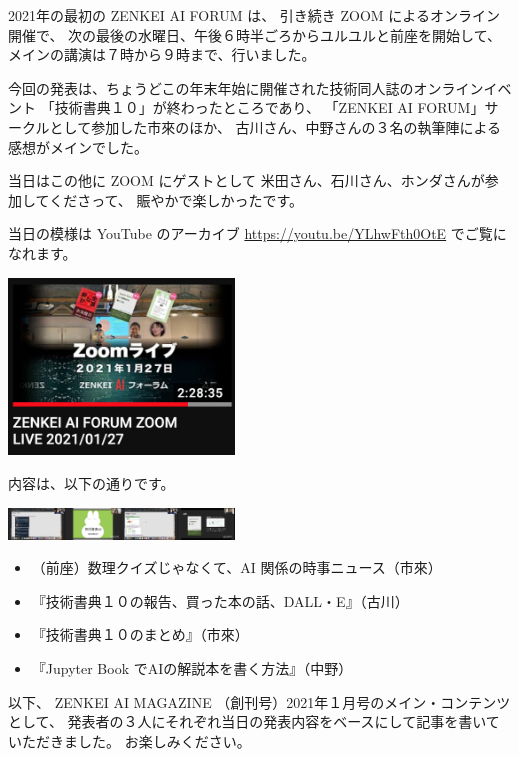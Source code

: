 \documentclass[dvipdfmx,autodetect-engine,10pt,b5paper,papersize,openany,dvipsnames]{jsbook}
\begin{document}
\begin{multicols}{2}
2021年の最初の ZENKEI AI FORUM は、
引き続き ZOOM によるオンライン開催で、
次の最後の水曜日、午後６時半ごろからユルユルと前座を開始して、
メインの講演は７時から９時まで、行いました。

今回の発表は、ちょうどこの年末年始に開催された技術同人誌のオンラインイベント
「技術書典１０」が終わったところであり、
「ZENKEI AI FORUM」サークルとして参加した市來のほか、
古川さん、中野さんの３名の執筆陣による感想がメインでした。

当日はこの他に ZOOM にゲストとして
米田さん、石川さん、ホンダさんが参加してくださって、
賑やかで楽しかったです。

当日の模様は YouTube のアーカイブ
\url{https://youtu.be/YLhwFth0OtE}
でご覧になれます。

\includegraphics[width=0.45\textwidth]{images/202101/youtube.jpg}

内容は、以下の通りです。

\includegraphics[width=0.45\textwidth]{images/202101/youtube-all.jpg}

\begin{itemize}
\item （前座）数理クイズじゃなくて、AI 関係の時事ニュース（市來）
\item 『技術書典１０の報告、買った本の話、DALL・E』（古川）
\item 『技術書典１０のまとめ』（市來）
\item 『Jupyter Book でAIの解説本を書く方法』（中野）
\end{itemize}

以下、
ZENKEI AI MAGAZINE （創刊号）2021年１月号のメイン・コンテンツとして、
発表者の３人にそれぞれ当日の発表内容をベースにして記事を書いていただきました。
お楽しみください。
\end{multicols}

\newpage
\end{document}
